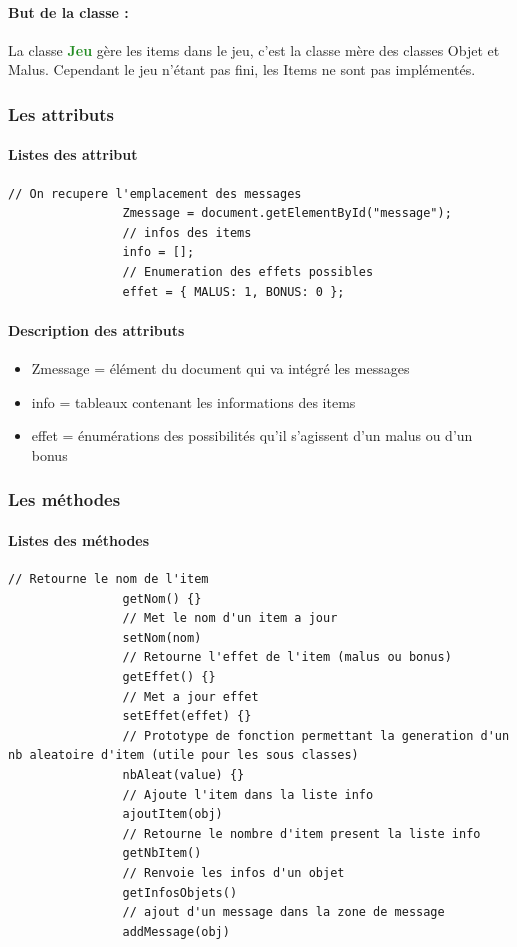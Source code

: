 \documentclass[12pt,a4paper]{report}
\begin{document}
			\paragraph{But de la classe : }
			La classe \textbf{\textcolor{ForestGreen}{Jeu}} gère les items dans le jeu, c'est la classe mère des classes Objet et Malus. 
			Cependant le jeu n'étant pas fini, les Items ne sont pas implémentés.
			\subsubsection{Les attributs}
			\paragraph{Listes des attribut}
			\begin{lstlisting}[caption={Attributs classe Message}]
				// On recupere l'emplacement des messages 
				Zmessage = document.getElementById("message");
				// infos des items
				info = [];
				// Enumeration des effets possibles
				effet = { MALUS: 1, BONUS: 0 };

			\end{lstlisting}
			\paragraph{Description des attributs}
			\begin{itemize}
				\item Zmessage = élément du document qui va intégré les messages
				\item info = tableaux contenant les informations des items
				\item effet = énumérations des possibilités qu'il s'agissent d'un malus ou d'un bonus
			\end{itemize}
			\subsubsection{Les méthodes}
			\paragraph{Listes des méthodes}
			\begin{lstlisting}[caption={Méthodes classe Message}]
				// Retourne le nom de l'item
				getNom() {}
				// Met le nom d'un item a jour
				setNom(nom)
				// Retourne l'effet de l'item (malus ou bonus)
				getEffet() {}
				// Met a jour effet
				setEffet(effet) {}
				// Prototype de fonction permettant la generation d'un nb aleatoire d'item (utile pour les sous classes)
				nbAleat(value) {}
				// Ajoute l'item dans la liste info
				ajoutItem(obj)
				// Retourne le nombre d'item present la liste info
				getNbItem()
				// Renvoie les infos d'un objet
				getInfosObjets()
				// ajout d'un message dans la zone de message
				addMessage(obj)
			\end{lstlisting}
\end{document}
